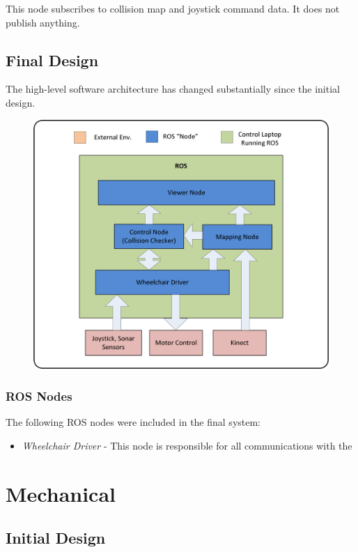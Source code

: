 \documentclass[oneside,final,a4paper]{report}
\begin{document}
This node subscribes to collision map and joystick command data.  It does not publish anything.

\section{Final Design}
The high-level software architecture has changed substantially since the initial design.

\begin{figure}
 \centering
 \includegraphics[scale=0.5]{FYDP_Software_Diagram}
\end{figure}


\subsection{ROS Nodes}
The following ROS nodes were included in the final system:
\begin{itemize}
 \item \emph{Wheelchair Driver} - This node is responsible for all communications with the 
\end{itemize}


\chapter{Mechanical}

\section{Initial Design}
\end{document}
